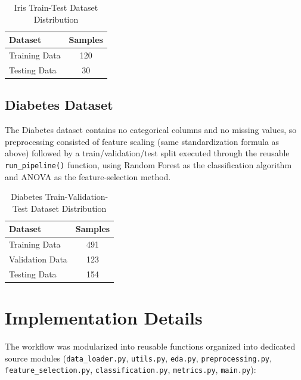 \documentclass[12pt,a4paper]{article}
\begin{document}
\begin{table}[H]
\centering
\begin{tabular}{lc}
\toprule
Dataset & Samples \\
\midrule
Training Data & 120 \\
Testing Data & 30 \\
\bottomrule
\end{tabular}
\caption{Iris Train-Test Dataset Distribution}
\end{table}

\subsection{Diabetes Dataset}

The Diabetes dataset contains no categorical columns and no missing values, so preprocessing consisted of feature scaling (same standardization formula as above) followed by a train/validation/test split executed through the reusable \texttt{run\_pipeline()} function, using Random Forest as the classification algorithm and ANOVA as the feature-selection method.

\begin{table}[H]
\centering
\begin{tabular}{lc}
\toprule
Dataset & Samples \\
\midrule
Training Data & 491 \\
Validation Data & 123 \\
Testing Data & 154 \\
\bottomrule
\end{tabular}
\caption{Diabetes Train-Validation-Test Dataset Distribution}
\end{table}

\section{Implementation Details}

The workflow was modularized into reusable functions organized into dedicated source modules (\texttt{data\_loader.py}, \texttt{utils.py}, \texttt{eda.py}, \texttt{preprocessing.py}, \texttt{feature\_selection.py}, \texttt{classification.py}, \texttt{metrics.py}, \texttt{main.py}):
\end{document}
